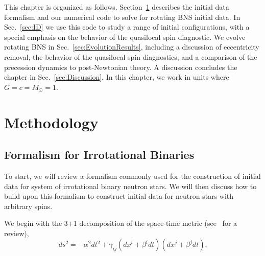 This chapter is organized as follows. Section~\ref{sec:Methodology}
describes the initial data formalism and our numerical code to solve
for rotating BNS initial data. In Sec.~\ref{sec:ID} we use this
code to study a range of initial configurations, 
with a special emphasis on the behavior of
the quasilocal spin diagnostic. We evolve rotating BNS in
Sec.~\ref{sec:EvolutionResults}, including a discussion of
eccentricity removal, the behavior of the quasilocal spin
diagnostics, and a comparison of the precession dynamics to
post-Newtonian theory. A discussion concludes the chapter in
Sec.~\ref{sec:Discussion}. In this chapter, we work in units where $G=c=M_{\odot}=1$.

\section{Methodology}
\label{sec:Methodology}

\subsection{Formalism for Irrotational Binaries}
\label{sec:IrrotFormalism}

To start, we will review a formalism commonly used for the 
construction of initial data for system of irrotational binary neutron stars. 
We will then discuss how to
build upon this formalism to construct initial data for neutron stars
with arbitrary spins.

We begin with the 3+1 decomposition of the space-time metric
(see~\cite{2007gr.qc.....3035G} for a review),
\begin{equation}
ds^2 = -\alpha^2 dt^2 + \gamma_{ij}\left(dx^i +
\beta^idt\right)\left(dx^j + \beta^jdt\right).
\end{equation}

